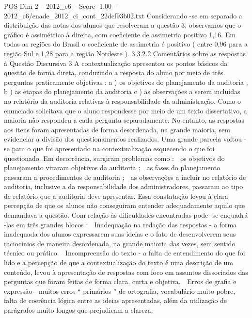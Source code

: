 \begin{textsample}{POS Dim 2 – 2012\_c6 – Score -1.00 – 2012\_c6/enade\_2012\_ci\_cont\_22dcf93b02.txt}
Considerando -se em separado a distribuição das notas dos alunos que resolveram a questão 3, observamos que o gráfico é assimétrico à direita, com coeficiente de assimetria positivo 1,16.
Em todas as regiões do Brasil o coeficiente de assimetria é positivo ( entre 0,96 para a região Sul e 1,28 para a região Nordeste ). 3.3.2.2 Comentários sobre as respostas à Questão Discursiva 3 A contextualização apresentou os pontos básicos da questão de forma direta, conduzindo a resposta do aluno por meio de três perguntas praticamente objetivas : a ) os objetivos do planejamento da auditoria ; b ) as etapas do planejamento da auditoria c ) as observações a serem incluídas no relatório da auditoria relativas à responsabilidade da administração.
Como o enunciado solicitava que o aluno respondesse por meio de um texto dissertativo, a maioria não respondeu a cada pergunta separadamente.
No entanto, as respostas aos itens foram apresentadas de forma desordenada, na grande maioria, sem evidenciar a divisão dos questionamentos realizados.
Uma grande parcela voltou -se para o que foi apresentado na contextualização esquecendo o que foi questionado.
Em decorrência, surgiram problemas como :  os objetivos do planejamento viraram objetivos da auditoria ;  as fases do planejamento passaram a procedimentos de auditoria ;  as observações a incluir no relatório de auditoria, inclusive a da responsabilidade dos administradores, passaram ao tipo de relatório que a auditoria deve apresentar.
Essa constatação levou à clara percepção de que os alunos não conseguiram entender adequadamente aquilo que demandava a questão.
Com relação às dificuldades encontradas pode -se enquadrá -las em três grandes blocos :  Inadequação na redação das respostas - a forma inadequada dos alunos expressarem suas ideias e o fato de desenvolverem seus raciocínios de maneira desordenada, na grande maioria das vezes, sem sentido técnico ou prático.  Incompreensão do texto - a falta de entendimento do que foi lido e a percepção de que a contextualização do texto é uma descrição de um conteúdo, levou à apresentação de respostas com foco em assuntos dissociados das perguntas que foram feitas de forma clara, curta e objetiva.  Erros de grafia e expressão - muitos erros “ primários ” de ortografia, vocabulário muito pobre, falta de coerência lógica entre as ideias apresentadas, além da utilização de parágrafos muito longos que prejudicam a clareza.

\end{textsample}
